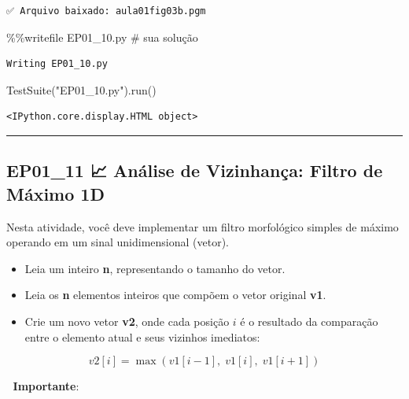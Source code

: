 \documentclass[
  portuguese,
  letterpaper,
  openany,
  oneside,
  12pt,
  a4paper]{book}
\newenvironment{Shaded}{\begin{snugshade}}{\end{snugshade}}
\newcommand{\CommentTok}[1]{\textcolor[rgb]{0.37,0.37,0.37}{#1}}
\newcommand{\NormalTok}[1]{\textcolor[rgb]{0.00,0.23,0.31}{#1}}
\newcommand{\OperatorTok}[1]{\textcolor[rgb]{0.37,0.37,0.37}{#1}}
\newcommand{\StringTok}[1]{\textcolor[rgb]{0.13,0.47,0.30}{#1}}
\providecommand{\tightlist}{%
  \setlength{\itemsep}{0pt}\setlength{\parskip}{0pt}}
\begin{document}
\begin{tcolorbox}
\begin{verbatim}
✅ Arquivo baixado: aula01fig03b.pgm
\end{verbatim}

\begin{Shaded}
\begin{Highlighting}[]
\OperatorTok{\%\%}\NormalTok{writefile EP01\_10.py}
\CommentTok{\# sua solução}
\end{Highlighting}
\end{Shaded}

\begin{verbatim}
Writing EP01_10.py
\end{verbatim}

\begin{Shaded}
\begin{Highlighting}[]
\NormalTok{TestSuite(}\StringTok{"EP01\_10.py"}\NormalTok{).run()}
\end{Highlighting}
\end{Shaded}

\begin{verbatim}
<IPython.core.display.HTML object>
\end{verbatim}

\begin{center}\rule{0.5\linewidth}{0.5pt}\end{center}

\subsection{EP01\_11 📈 Análise de Vizinhança: Filtro de Máximo
1D}\label{ep01_11-anuxe1lise-de-vizinhanuxe7a-filtro-de-muxe1ximo-1d}

Nesta atividade, você deve implementar um filtro morfológico simples de
máximo operando em um sinal unidimensional (vetor).

\begin{itemize}
\tightlist
\item
  Leia um inteiro \textbf{n}, representando o tamanho do vetor.
\item
  Leia os \textbf{n} elementos inteiros que compõem o vetor original
  \textbf{v1}.
\item
  Crie um novo vetor \textbf{v2}, onde cada posição \(i\) é o resultado
  da comparação entre o elemento atual e seus vizinhos imediatos:
\end{itemize}

\[v2[i] = \max(v1[i-1],\; v1[i],\; v1[i+1])\]

📌 \textbf{Importante}:


\end{tcolorbox}
\end{document}
